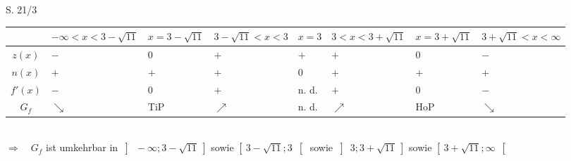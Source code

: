 \begin{Exercise}{S. 21/3}{}
\begin{enumerate}
\begin{enumerate}[label=\alph*)]
{\begin{itemize}[leftmargin=*]
{                        \begin{tabularx}{0.95\linewidth}{c|X|X|X|X|X|X|X}
                            & $-\infty < x < 3 -\sqrt{11}$ & $x = 3 -\sqrt{11}$ & $3 -\sqrt{11} < x < 3$ & $x = 3$ & $3 < x < 3 +\sqrt{11}$ & $x = 3 +\sqrt{11}$ & $3 +\sqrt{11} < x < \infty$ \\ \hline
                            $z(x)$ & $-$ & $0$ & $+$ & $+$ & $+$ & $0$ & $-$ \\ \hline
                            $n(x)$ & $+$ & $+$ & $+$ & 0 & $+$ & $+$ & $+$ \\ \hline
                            $f'(x)$ & $-$ & $0$ & $+$ & n. d. & $+$ & $0$ & $-$ \\ \hline
                            $G_{f}$ & $\searrow$ & TiP & $\nearrow$ & n. d. & $\nearrow$ & HoP & $\searrow$ \\              
                        \end{tabularx}\\[4.0ex]
                        $\Rightarrow \quad G_{f}$ ist umkehrbar in $\left] \ -\infty; 3 -\sqrt{11} \ \right]$ sowie $\left[ \ 3 -\sqrt{11}; 3 \ \right[$ sowie $\left] \ 3; 3 +\sqrt{11} \ \right]$ sowie $\left[ \ 3 +\sqrt{11}; \infty \ \right[$
                        }
                \end{itemize}
                }
        \end{enumerate}
    \end{enumerate}
\end{Exercise}

